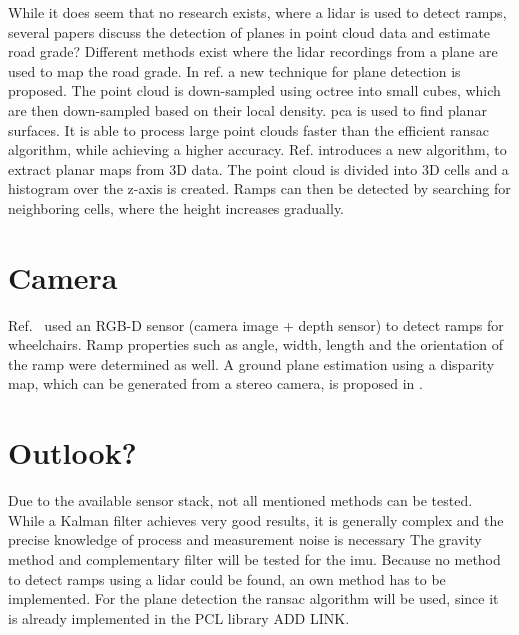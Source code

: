 While it does seem that no research exists, where a \gls{lidar} is used to detect ramps, several papers discuss the detection of planes in point cloud data and estimate road grade?
Different methods exist where the \gls{lidar} recordings from a plane are used to map the road grade.
In ref. \cite{El-Sayed2018} a new technique for plane detection is proposed.
The point cloud is down-sampled using octree into small cubes, which are then down-sampled based on their local density.
\gls{pca} is used to find planar surfaces.
It is able to process large point clouds faster than the efficient \gls{ransac} algorithm, while achieving a higher accuracy.
Ref. \cite{Sakenas2007} introduces a new algorithm, to extract planar maps from 3D data.
The point cloud is divided into 3D cells and a histogram over the z-axis is created.
Ramps can then be detected by searching for neighboring cells, where the height increases gradually.



\section{Camera}
Ref.~\cite{Nejati2016} used an RGB-D sensor (camera image + depth sensor) to detect ramps for wheelchairs.
Ramp properties such as angle, width, length and the orientation of the ramp were determined as well.
A ground plane estimation using a disparity map, which can be generated from a stereo camera, is proposed in \cite{Chumerin2008}.



\section{Outlook?}
Due to the available sensor stack, not all mentioned methods can be tested.
While a Kalman filter achieves very good results, it is generally complex and the precise knowledge of process and measurement noise is necessary \cite{Higgins1975}
The gravity method and complementary filter will be tested for the \gls{imu}.
Because no method to detect ramps using a \gls{lidar} could be found, an own method has to be implemented.
For the plane detection the \gls{ransac} algorithm will be used, since it is already implemented in the PCL library ADD LINK.